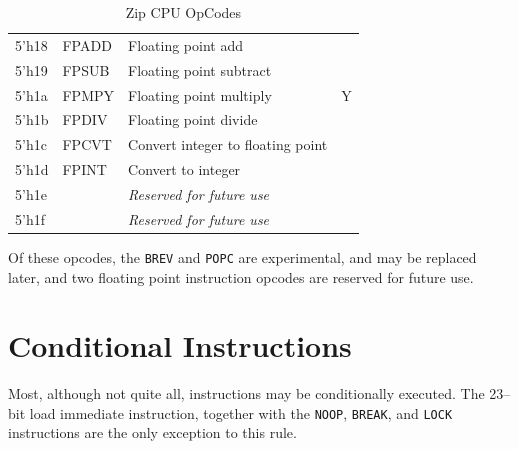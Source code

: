\documentclass{gqtekspec}
\begin{document}
\begin{table}
\begin{center}
\begin{tabular}{|l|l|l|c|}
5'h18 & FPADD & Floating point add &  \\\cline{1-3}
5'h19 & FPSUB & Floating point subtract &   \\\cline{1-3}
5'h1a & FPMPY & Floating point multiply & Y \\\cline{1-3}
5'h1b & FPDIV & Floating point divide &   \\\cline{1-3}
5'h1c & FPCVT & Convert integer to floating point &   \\\cline{1-3}
5'h1d & FPINT & Convert to integer &   \\\hline
5'h1e & & {\em Reserved for future use} &\\\hline
5'h1f & & {\em Reserved for future use} &\\\hline
\end{tabular}
\caption{Zip CPU OpCodes}\label{tbl:iset-opcodes}
\end{center}\end{table}
%
Of these opcodes, the {\tt BREV} and {\tt POPC} are experimental, and may be
replaced later, and two floating point instruction opcodes are reserved for
future use.

\section{Conditional Instructions}
Most, although not quite all, instructions may be conditionally executed.  
The 23--bit load immediate instruction, together with the {\tt NOOP}, 
{\tt BREAK}, and {\tt LOCK} instructions are the only exception to this rule.
\end{document}
